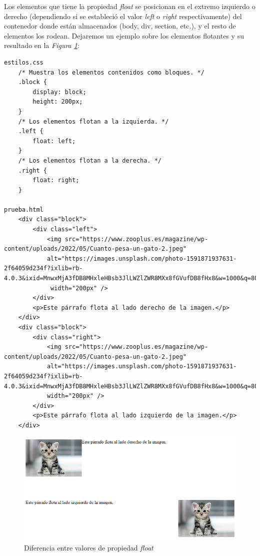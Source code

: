 Los elementos que tiene la propiedad \textit{float} se posicionan en el extremo izquierdo o derecho (dependiendo si se estableció el valor \textit{left} o \textit{right} respectivamente) del contenedor donde están almacenados (body, div, section, etc.), y el resto de elementos los rodean. Dejaremos un ejemplo sobre los elementos flotantes y su resultado en la \textit{Figura \ref{fig: 26}}:
\begin{lstlisting}
estilos.css
    /* Muestra los elementos contenidos como bloques. */
    .block {
        display: block;
        height: 200px;
    }
    /* Los elementos flotan a la izquierda. */
    .left {
        float: left;
    }
    /* Los elementos flotan a la derecha. */
    .right {
        float: right;
    }

prueba.html
    <div class="block">
        <div class="left">
            <img src="https://www.zooplus.es/magazine/wp-content/uploads/2022/05/Cuanto-pesa-un-gato-2.jpeg"
            alt="https://images.unsplash.com/photo-1591871937631-2f64059d234f?ixlib=rb-4.0.3&ixid=MnwxMjA3fDB8MHxleHBsb3JlLWZlZWR8MXx8fGVufDB8fHx8&w=1000&q=80"
             width="200px" />
        </div>
        <p>Este párrafo flota al lado derecho de la imagen.</p>
    </div>
    <div class="block">
        <div class="right">
            <img src="https://www.zooplus.es/magazine/wp-content/uploads/2022/05/Cuanto-pesa-un-gato-2.jpeg"
            alt="https://images.unsplash.com/photo-1591871937631-2f64059d234f?ixlib=rb-4.0.3&ixid=MnwxMjA3fDB8MHxleHBsb3JlLWZlZWR8MXx8fGVufDB8fHx8&w=1000&q=80"
            width="200px" />
        </div>
        <p>Este párrafo flota al lado izquierdo de la imagen.</p>
    </div>
\end{lstlisting}
\begin{figure}[H]
    \centering
    \caption{Diferencia entre valores de propiedad \textit{float}}
    \label{fig: 26}
    \includegraphics[width=14cm]{ss/float.png}
\end{figure}

